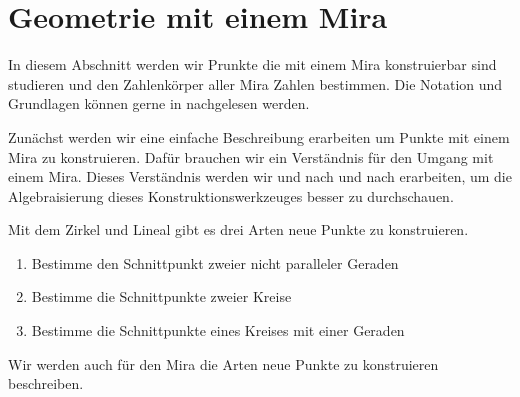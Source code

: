 \chapter{Geometrie mit einem Mira}

In diesem Abschnitt werden wir Prunkte die mit einem Mira konstruierbar sind studieren und den Zahlenkörper aller Mira Zahlen bestimmen.
Die Notation und Grundlagen können gerne in \cite{Vogel} nachgelesen werden.


Zunächst werden wir eine einfache Beschreibung erarbeiten um Punkte mit einem Mira zu konstruieren. Dafür brauchen wir ein Verständnis für den Umgang mit einem Mira. Dieses Verständnis werden wir und nach und nach erarbeiten, um die Algebraisierung dieses Konstruktionswerkzeuges besser zu durchschauen. 

\begin{remark}
    Mit dem Zirkel und Lineal gibt es drei Arten neue Punkte zu konstruieren.
    \begin{enumerate}
        \item Bestimme den Schnittpunkt zweier nicht paralleler Geraden
        \item Bestimme die Schnittpunkte zweier Kreise
        \item Bestimme die Schnittpunkte eines Kreises mit einer Geraden
    \end{enumerate}
    Wir werden auch für den Mira die Arten neue Punkte zu konstruieren beschreiben.
\end{remark}

